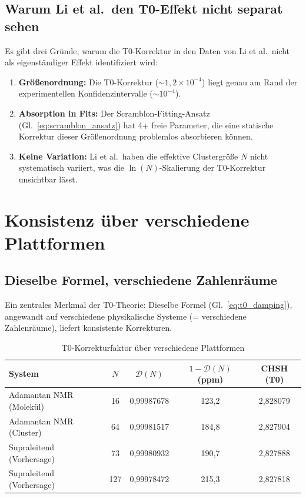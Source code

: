 \subsection{Warum Li et al.\ den T0-Effekt nicht separat sehen}

Es gibt drei Gründe, warum die T0-Korrektur in den Daten von Li et al.\ nicht als eigenständiger Effekt identifiziert wird:

\begin{enumerate}
	\item \textbf{Größenordnung:} Die T0-Korrektur ($\sim 1{,}2 \times 10^{-4}$) liegt genau am Rand der experimentellen Konfidenzintervalle ($\sim 10^{-4}$).
	\item \textbf{Absorption in Fits:} Der Scramblon-Fitting-Ansatz (Gl.~\ref{eq:scramblon_ansatz}) hat 4+ freie Parameter, die eine statische Korrektur dieser Größenordnung problemlos absorbieren können.
	\item \textbf{Keine Variation:} Li et al.\ haben die effektive Clustergröße $N$ nicht systematisch variiert, was die $\ln(N)$-Skalierung der T0-Korrektur unsichtbar lässt.
\end{enumerate}


\section{Konsistenz über verschiedene Plattformen}
\label{sec:crossplatform}

\subsection{Dieselbe Formel, verschiedene Zahlenräume}

Ein zentrales Merkmal der T0-Theorie: Dieselbe Formel (Gl.~\ref{eq:t0_damping}), angewandt auf verschiedene physikalische Systeme (= verschiedene Zahlenräume), liefert konsistente Korrekturen.

\begin{table}[h]
	\centering
	\caption{T0-Korrekturfaktor über verschiedene Plattformen}
	\label{tab:cross_platform}
	\begin{tabular}{@{}lcccc@{}}
		\toprule
		System & $N$ & $\mathcal{D}(N)$ & $1-\mathcal{D}(N)$ (ppm) & CHSH (T0) \\
		\midrule
		Adamantan NMR (Molekül) & 16 & 0,99987678 & 123,2 & 2,828079 \\
		Adamantan NMR (Cluster) & 64 & 0,99981517 & 184,8 & 2,827904 \\
		Supraleitend (Vorhersage) & 73 & 0,99980932 & 190,7 & 2,827888 \\
		Supraleitend (Vorhersage) & 127 & 0,99978472 & 215,3 & 2,827818 \\
		\bottomrule
	\end{tabular}
\end{table}

